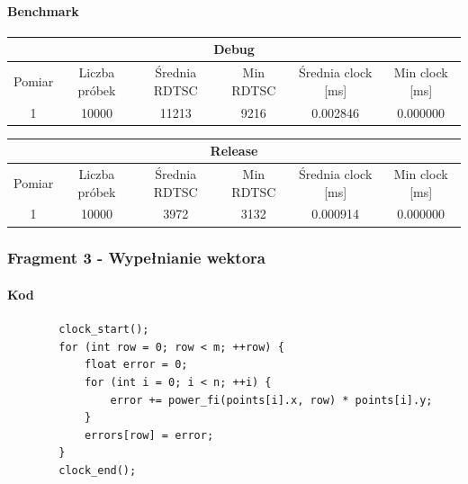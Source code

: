 \documentclass{article}
\begin{document}
	\paragraph{Benchmark}
	\begin{center}
		\begin{tabular}{|c|c|c|c|c|c|} \hline
			\multicolumn{6}{|c|}{Debug} \\\hline
			Pomiar  & Liczba próbek & Średnia RDTSC & Min RDTSC & Średnia clock [ms] & Min clock [ms] \\\hline
			\hline
			1 & 10000 & 11213 & 9216 & 0.002846 & 0.000000 \\\hline
			
		\end{tabular}
	\end{center}
	\begin{center}
		\begin{tabular}{|c|c|c|c|c|c|} \hline
			\multicolumn{6}{|c|}{Release} \\\hline
			Pomiar  & Liczba próbek & Średnia RDTSC & Min RDTSC & Średnia clock [ms] & Min clock [ms] \\\hline
			\hline
			1 & 10000 & 3972 & 3132 & 0.000914 & 0.000000 \\\hline
			
		\end{tabular}
	\end{center}
	
	\subsubsection{Fragment 3 - Wypełnianie wektora}
	\paragraph{Kod}
	\begin{verbatim}
		clock_start();
		for (int row = 0; row < m; ++row) {
			float error = 0;
			for (int i = 0; i < n; ++i) {
				error += power_fi(points[i].x, row) * points[i].y;
			}
			errors[row] = error;
		}
		clock_end();
	\end{verbatim}
\end{document}
